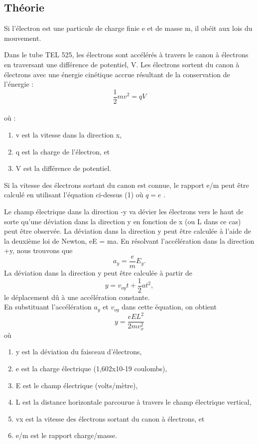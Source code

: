 \documentclass[../main.tex]{subfiles}
\begin{document}
\subsection{Théorie}
Si l'électron est une particule de charge finie e et de masse m, il obéit aux lois du mouvement. \\
\par Dans le tube TEL 525, les électrons sont accélérés à travers le canon à électrons en traversant une différence de potentiel, V. Les électrons sortent du canon à électrons avec une énergie cinétique accrue résultant de la conservation de l'énergie :\\
$$\frac{1}{2}mv^2 = qV$$\\
où :\\
\begin{enumerate}
    \item v est la vitesse dans la direction x, 
    \item q est la charge de l'électron, et 
    \item V est la différence de potentiel. 
\end{enumerate}
Si la vitesse des électrons sortant du canon est connue, le rapport e/m peut être calculé en utilisant l'équation ci-dessus (1) où $q = e$ .\\
\par Le champ électrique dans la direction -y va dévier les électrons vers le haut de sorte qu'une déviation dans la direction y en fonction de x (ou L dans ce cas) peut être observée.  La déviation dans la direction y peut être calculée à l'aide de la deuxième loi de Newton, eE = ma.  En résolvant l'accélération dans la direction +y, nous trouvons que\\
$$a_y = \frac{e}{m}E_y.$$ 
La déviation dans la direction y peut être calculée à partir de\\
$$y = v_{oy}t + \frac{1}{2}at^2,$$
le déplacement dû à une accélération constante.\\    En substituant l'accélération $a_y$ et $v_{oy}$ dans cette équation, on obtient \\
$$y = \frac{eEL^2}{2mv_x^2}$$
où\\
\begin{enumerate}
    \item y est la déviation du faisceau d'électrons,
    \item e est la charge électrique (1,602x10-19 coulombs),
    \item E est le champ électrique (volts/mètre), 
    \item L est la distance horizontale parcourue à travers le champ électrique vertical,
    \item vx est la vitesse des électrons sortant du canon à électrons, et
    \item e/m est le rapport charge/masse.
\end{enumerate}
\end{document}
